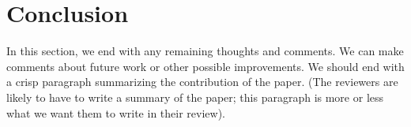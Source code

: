 \section{Conclusion}
\label{sec:conclusion}
In this section, we end with any remaining thoughts and comments.  We
can make comments about future work or other possible improvements.
We should end with a crisp paragraph summarizing the contribution of
the paper.  (The reviewers are likely to have to write a summary of
the paper; this paragraph is more or less what we want them to write
in their review).
